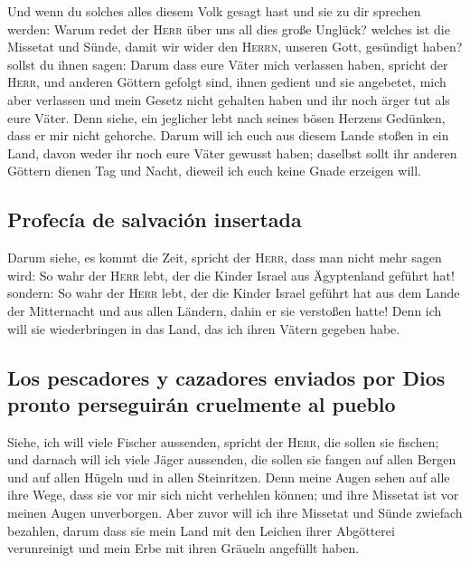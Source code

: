  Und wenn du solches alles diesem Volk gesagt hast und
sie zu dir sprechen werden: Warum redet der \textsc{Herr} über uns all
dies große Unglück? welches ist die Missetat und Sünde, damit wir wider
den \textsc{Herrn}, unseren Gott, gesündigt haben? 
sollst du ihnen sagen: Darum dass eure Väter mich verlassen haben,
spricht der \textsc{Herr}, und anderen Göttern gefolgt sind, ihnen
gedient und sie angebetet, mich aber verlassen und mein Gesetz nicht
gehalten haben  und ihr noch ärger tut als eure Väter.
Denn siehe, ein jeglicher lebt nach seines bösen Herzens Gedünken, dass
er mir nicht gehorche.  Darum will ich euch aus diesem
Lande stoßen in ein Land, davon weder ihr noch eure Väter gewusst haben;
daselbst sollt ihr anderen Göttern dienen Tag und Nacht, dieweil ich
euch keine Gnade erzeigen will.

\hypertarget{profecuxeda-de-salvaciuxf3n-insertada}{%
\subsection{Profecía de salvación
insertada}\label{profecuxeda-de-salvaciuxf3n-insertada}}

 Darum siehe, es kommt die Zeit, spricht der
\textsc{Herr}, dass man nicht mehr sagen wird: So wahr der \textsc{Herr}
lebt, der die Kinder Israel aus Ägyptenland geführt hat! 
sondern: So wahr der \textsc{Herr} lebt, der die Kinder Israel geführt
hat aus dem Lande der Mitternacht und aus allen Ländern, dahin er sie
verstoßen hatte! Denn ich will sie wiederbringen in das Land, das ich
ihren Vätern gegeben habe.

\hypertarget{los-pescadores-y-cazadores-enviados-por-dios-pronto-perseguiruxe1n-cruelmente-al-pueblo}{%
\subsection{Los pescadores y cazadores enviados por Dios pronto
perseguirán cruelmente al
pueblo}\label{los-pescadores-y-cazadores-enviados-por-dios-pronto-perseguiruxe1n-cruelmente-al-pueblo}}

 Siehe, ich will viele Fischer aussenden, spricht der
\textsc{Herr}, die sollen sie fischen; und darnach will ich viele Jäger
aussenden, die sollen sie fangen auf allen Bergen und auf allen Hügeln
und in allen Steinritzen.  Denn meine Augen sehen auf
alle ihre Wege, dass sie vor mir sich nicht verhehlen können; und ihre
Missetat ist vor meinen Augen unverborgen.  Aber zuvor
will ich ihre Missetat und Sünde zwiefach bezahlen, darum dass sie mein
Land mit den Leichen ihrer Abgötterei verunreinigt und mein Erbe mit
ihren Gräueln angefüllt haben.

